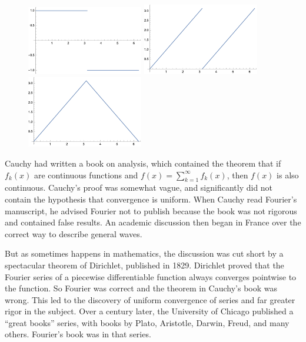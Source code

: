 \documentclass[11pt, oneside]{article}   	%
\begin{document}
\begin{figure}[htbp] %
   \centering
   \includegraphics[width=2in]{Graphics/square} \hspace{.5in}   \includegraphics[width=2in]{Graphics/sawtooth}
    \hspace{.5in}   \includegraphics[width=2in]{Graphics/wedge}
\end{figure}

Cauchy had written a book on analysis, which contained the theorem that if $f_k(x)$ are continuous functions and $f(x) = \sum_{k = 1}^\infty f_k(x)$, then $f(x)$ is also continuous. Cauchy's proof was somewhat vague, and significantly did not contain the hypothesis that convergence is uniform. When Cauchy read Fourier's manuscript, he advised Fourier not to publish because the book was not rigorous and contained  false results. An academic discussion then began in France over the correct way to describe general waves.

But as sometimes happens in mathematics, the discussion was cut short by a spectacular theorem of Dirichlet, published in 1829. Dirichlet proved that the Fourier series of a piecewise differentiable function always converges pointwise to the function. So Fourier was correct and the theorem in Cauchy's book was wrong. This led to the discovery of uniform convergence of series and far greater rigor in the subject. Over a century later, the University of Chicago published a ``great books'' series, with books by Plato, Aristotle, Darwin, Freud, and many others. Fourier's book was in that series.
\end{document}
